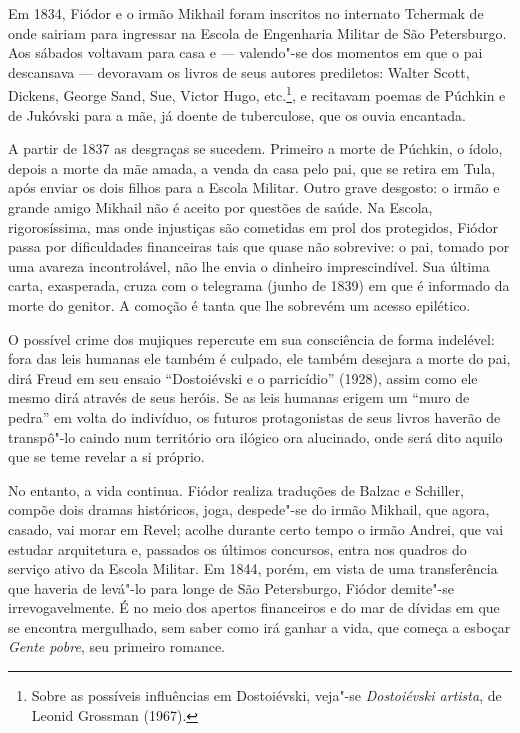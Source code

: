 Em 1834, Fiódor e o irmão Mikhail foram inscritos no internato Tchermak
de onde sairiam para ingressar na Escola de Engenharia Militar
de São Petersburgo. Aos sábados voltavam para casa e --- valendo"-se dos momentos em que o pai descansava --- devoravam os livros de seus autores prediletos: Walter Scott, Dickens, George Sand, Sue, Victor Hugo, etc.\footnote{Sobre as possíveis influências em Dostoiévski, veja"-se \emph{Dostoiévski artista}, de Leonid Grossman (1967).}, e recitavam poemas de Púchkin e
de Jukóvski para a mãe, já doente de tuberculose, que os ouvia
encantada.

A partir de 1837 as desgraças se sucedem. Primeiro a morte de
Púchkin, o ídolo, depois a morte da mãe amada, a venda da casa
pelo pai, que se retira em Tula, após enviar os dois filhos para
a Escola Militar. Outro grave desgosto: o irmão e grande amigo
Mikhail não é aceito por questões de saúde. Na Escola,
rigorosíssima, mas onde injustiças são cometidas em prol dos
protegidos, Fiódor passa por dificuldades financeiras tais que
quase não sobrevive: o pai, tomado por uma avareza incontrolável,
não lhe envia o dinheiro imprescindível. Sua última carta,
exasperada, cruza com o telegrama (junho de 1839) em que é
informado da morte do genitor. A comoção é tanta que lhe
sobrevém um acesso epilético.

O possível crime dos mujiques repercute em sua consciência de
forma indelével: fora das leis humanas ele também é culpado, ele
também desejara a morte do pai, dirá Freud em seu ensaio
``Dostoiévski e o parricídio'' (1928), assim como ele mesmo
dirá através de seus heróis. Se as leis humanas erigem um
``muro de pedra'' em volta do indivíduo, os futuros protagonistas
de seus livros haverão de transpô"-lo caindo num território ora
ilógico ora alucinado, onde será dito aquilo que se teme revelar
a si próprio.

No entanto, a vida continua. Fiódor realiza traduções de Balzac
e Schiller, compõe dois dramas históricos, joga, despede"-se do
irmão Mikhail, que agora, casado, vai morar em Revel; acolhe
durante certo tempo o irmão Andrei, que vai estudar arquitetura
e, passados os últimos concursos, entra nos quadros do serviço
ativo da Escola Militar. Em 1844, porém, em vista de uma
transferência que haveria de levá"-lo para longe de São
Petersburgo, Fiódor demite"-se irrevogavelmente. É no meio dos apertos
financeiros e do mar de dívidas em que se encontra mergulhado, sem saber
como irá ganhar a vida, que começa a esboçar \emph{Gente
pobre}, seu primeiro romance.


